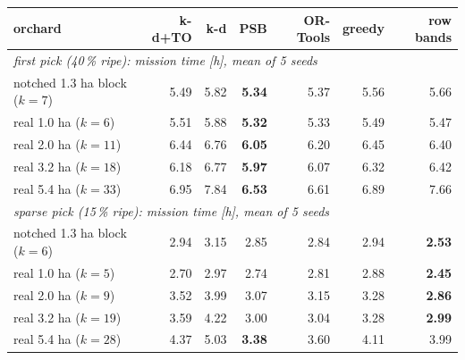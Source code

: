 \begin{tabular}{lrrrrrr}
\toprule
orchard & k-d+TO & k-d & PSB & OR-Tools & greedy & row bands \\
\midrule
\multicolumn{7}{l}{\emph{first pick (40\,\% ripe): mission time [h], mean of 5 seeds}} \\
notched 1.3 ha block ($k=7$) & 5.49 & 5.82 & \textbf{5.34} & 5.37 & 5.56 & 5.66 \\
real 1.0 ha ($k=6$) & 5.51 & 5.88 & \textbf{5.32} & 5.33 & 5.49 & 5.47 \\
real 2.0 ha ($k=11$) & 6.44 & 6.76 & \textbf{6.05} & 6.20 & 6.45 & 6.40 \\
real 3.2 ha ($k=18$) & 6.18 & 6.77 & \textbf{5.97} & 6.07 & 6.32 & 6.42 \\
real 5.4 ha ($k=33$) & 6.95 & 7.84 & \textbf{6.53} & 6.61 & 6.89 & 7.66 \\
\midrule
\multicolumn{7}{l}{\emph{sparse pick (15\,\% ripe): mission time [h], mean of 5 seeds}} \\
notched 1.3 ha block ($k=6$) & 2.94 & 3.15 & 2.85 & 2.84 & 2.94 & \textbf{2.53} \\
real 1.0 ha ($k=5$) & 2.70 & 2.97 & 2.74 & 2.81 & 2.88 & \textbf{2.45} \\
real 2.0 ha ($k=9$) & 3.52 & 3.99 & 3.07 & 3.15 & 3.28 & \textbf{2.86} \\
real 3.2 ha ($k=19$) & 3.59 & 4.22 & 3.00 & 3.04 & 3.28 & \textbf{2.99} \\
real 5.4 ha ($k=28$) & 4.37 & 5.03 & \textbf{3.38} & 3.60 & 4.11 & 3.99 \\
\bottomrule
\end{tabular}
